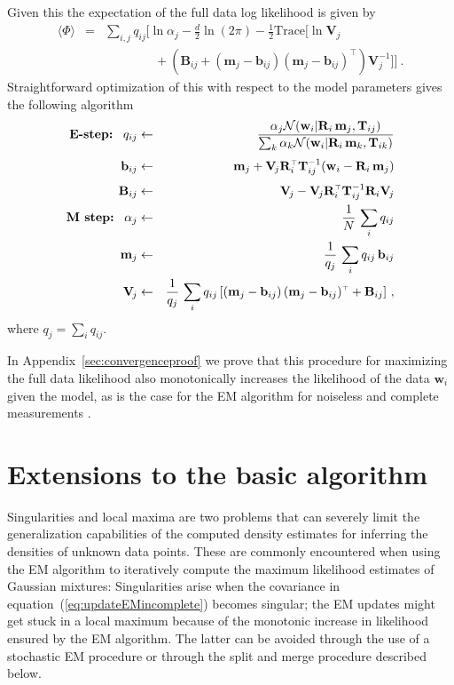 \documentclass[aoas,preprint,authoryear,round]{imsart}
\newcommand{\eqnnumber}{equation}
\newcommand{\normal}{{\cal N}}
\renewcommand{\vec}[1]{\mathbf{#1}} %
\newcommand{\bb}{\vec{b}}
\newcommand{\mm}{\vec{m}}
\newcommand{\ww}{\vec{w}}
\newcommand{\bij}{\bb_{ij}}
\newcommand{\bbij}{\bij}
\newcommand{\mmj}{\mm_j}
\newcommand{\mmk}{\mm_k}
\newcommand{\wwi}{\ww_i}
\newcommand{\ten}[1]{\mathbf{#1}} %
\newcommand{\BB}{\ten{B}}
\newcommand{\RR}{\ten{R}}
\newcommand{\TT}{\ten{T}}
\newcommand{\VV}{\ten{V}}
\newcommand{\BBij}{\BB_{ij}}
\newcommand{\RRi}{\RR_i}
\newcommand{\VVj}{\VV_{\!j}} %
\newcommand{\TTij}{\TT_{ij}}
\newcommand{\TTik}{\TT_{ik}}
\newcommand{\T}{^{\scriptscriptstyle \top}}   %
\newcommand{\alphaj}{\alpha_j}
\newcommand{\qij}{q_{ij}}
\newcommand{\qqj}{q_j}
\newcommand{\trace}{\mathrm{Trace}}
\newcommand{\EPhi}{\langle\Phi\rangle}
\begin{document}
Given this the expectation of the full data log likelihood is given by
\begin{eqnarray}\textstyle\label{eq:incompletefulldataloglike}
\EPhi &=&  \sum_{i,j} \qij \bigg[ \ln \alpha_j -\frac{d}{2} 
\ln (2 \pi) - \frac{1}{2} \trace \big[\ln\VVj\\
&\phantom{=}& \qquad \qquad  + (\BBij + (\mmj - \bbij)(\mmj - \bbij)\T) \VVj^{-1} \big]\bigg]\ .\nonumber
\end{eqnarray}
Straightforward optimization of this with respect to the model
parameters gives the following algorithm
\begin{eqnarray}\displaystyle\label{eq:updateEMincomplete}
\mbox{\textbf{E-step:}}\;\;\;
\qij &\leftarrow& \frac{\alpha_j \normal(\wwi|\RRi\,\mmj,\TTij)}{\sum_k \alpha_k \normal(\wwi|\RRi\,\mmk,\TTik)}\nonumber\\[3pt]
\bbij &\leftarrow& \mmj + \VVj \RRi\T \TTij^{-1} (\wwi - \RRi\,\mmj)\nonumber\\[3pt]
\BBij &\leftarrow& \VVj - \VVj \RRi\T \TTij^{-1} \RRi \VVj \nonumber\\
\mbox{\textbf{M~step:}}\;\;\;
\alphaj &\leftarrow& \frac{1}{N}\,\sum_i \qij\nonumber \\
   \mmj &\leftarrow& \frac{1}{\qqj}\,\sum_i \qij\,\bbij\nonumber \\
   \VVj &\leftarrow& \frac{1}{\qqj}\,\sum_i \qij
                     \left[(\mmj-\bbij)\,(\mmj-\bbij)\T + \BBij\right]\, ,
\end{eqnarray}
where $\qqj=\sum_i \qij$.

In Appendix~\ref{sec:convergenceproof} we prove that this procedure
for maximizing the full data likelihood also monotonically increases
the likelihood of the data $\wwi$ given the model, as is the case for
the EM algorithm for noiseless and complete measurements
\citep{Dempster1977,Wu1983}.


\section{Extensions to the basic algorithm}

Singularities and local maxima are two problems that can severely
limit the generalization capabilities of the computed density
estimates for inferring the densities of unknown data points. These
are commonly encountered when using the EM algorithm to iteratively
compute the maximum likelihood estimates of Gaussian mixtures:
Singularities arise when the covariance in
\eqnnumber~(\ref{eq:updateEMincomplete}) becomes singular; the EM
updates might get stuck in a local maximum because of the monotonic
increase in likelihood ensured by the EM algorithm. The latter can be
avoided through the use of a stochastic EM procedure
\citep{Broniatowksi83,Celeux85a,Celeux86b} or through the split and
merge procedure described below.
\end{document}
